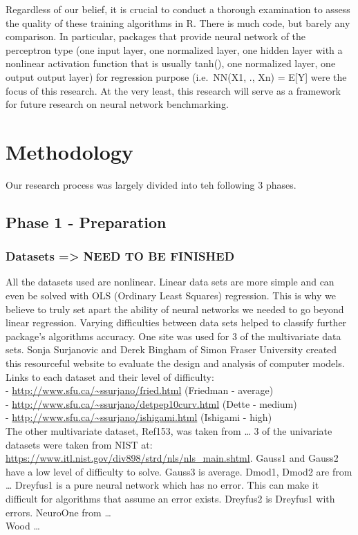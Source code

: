 Regardless of our belief, it is crucial to conduct a thorough
examination to assess the quality of these training algorithms in R.
There is much code, but barely any comparison. In particular, packages
that provide neural network of the perceptron type (one input layer, one
normalized layer, one hidden layer with a nonlinear activation function
that is usually tanh(), one normalized layer, one output output layer)
for regression purpose (i.e.~NN(X1, ., Xn) = E{[}Y{]} were the focus of
this research. At the very least, this research will serve as a
framework for future research on neural network benchmarking.

\hypertarget{methodology}{%
\section{Methodology}\label{methodology}}

Our research process was largely divided into teh following 3 phases.

\hypertarget{phase-1---preparation}{%
\subsection{Phase 1 - Preparation}\label{phase-1---preparation}}

\hypertarget{datasets-need-to-be-finished}{%
\subsubsection{Datasets =\textgreater{} NEED TO BE
FINISHED}\label{datasets-need-to-be-finished}}

All the datasets used are nonlinear. Linear data sets are more simple
and can even be solved with OLS (Ordinary Least Squares) regression.
This is why we believe to truly set apart the ability of neural networks
we needed to go beyond linear regression. Varying difficulties between
data sets helped to classify further package's algorithms accuracy. One
site was used for 3 of the multivariate data sets. Sonja Surjanovic and
Derek Bingham of Simon Fraser University created this resourceful
website to evaluate the design and analysis of computer models. Links to
each dataset and their level of difficulty:\\
- \url{http://www.sfu.ca/~ssurjano/fried.html} (Friedman - average)\\
- \url{http://www.sfu.ca/~ssurjano/detpep10curv.html} (Dette - medium)\\
- \url{http://www.sfu.ca/~ssurjano/ishigami.html} (Ishigami - high)\\
The other multivariate dataset, Ref153, was taken from \ldots{} 3 of the
univariate datasets were taken from NIST at:
\url{https://www.itl.nist.gov/div898/strd/nls/nls_main.shtml}. Gauss1
and Gauss2 have a low level of difficulty to solve. Gauss3 is average.
Dmod1, Dmod2 are from \ldots{} Dreyfus1 is a pure neural network which
has no error. This can make it difficult for algorithms that assume an
error exists. Dreyfus2 is Dreyfus1 with errors. NeuroOne from \ldots{}\\
Wood \ldots{}

